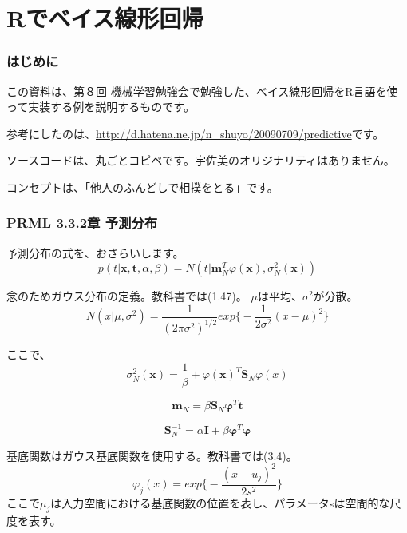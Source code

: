 \documentclass[uplatex]{jsarticle}
\begin{document}
\part{Rでベイス線形回帰}

\section{はじめに}
この資料は、第８回 機械学習勉強会で勉強した、ベイス線形回帰をR言語を使って実装する例を説明するものです。\par
参考にしたのは、\url{http://d.hatena.ne.jp/n_shuyo/20090709/predictive}です。\par
ソースコードは、丸ごとコピペです。宇佐美のオリジナリティはありません。\par
コンセプトは、{\Large 「他人のふんどしで相撲をとる」}です。


\section{PRML 3.3.2章 予測分布}
予測分布の式を、おさらいします。
\begin{equation}
p(t|\mathbf{x},\mathbf{t},α,β)=\mathit{N}(t|\mathbf{m}^{T}_{N}φ(\mathbf{x}),σ^{2}_{N}(\mathbf{x}))
\end{equation}

念のためガウス分布の定義。教科書では(1.47)。
$μ$は平均、$σ^2$が分散。
\begin{equation}
N(x|μ,σ^2)=\frac{1}{(2πσ^2)^{1/2}}exp\biggl\{-\frac{1}{2σ^2}(x-μ)^2\biggl\}
\end{equation}

ここで、
\begin{equation}
σ^2_N(\mathbf{x})=\frac{1}{β}+φ(\mathbf{x})^T\mathbf{S}_Nφ(x)
\end{equation}

\begin{equation}
\mathbf{m}_N=β\mathbf{S}_N\mathbf{φ}^T\mathbf{t}
\end{equation}

\begin{equation}
\mathbf{S}^{-1}_N=α\mathbf{I}+β\mathbf{φ}^T\mathbf{φ}
\end{equation}

基底関数はガウス基底関数を使用する。教科書では(3.4)。
\begin{equation}
φ_j(x)=exp\biggl\{-\frac{(x-u_j)^2}{2s^2}\biggl\}
\end{equation}
ここで$μ_j$は入力空間における基底関数の位置を表し、パラメータsは空間的な尺度を表す。
\end{document}
